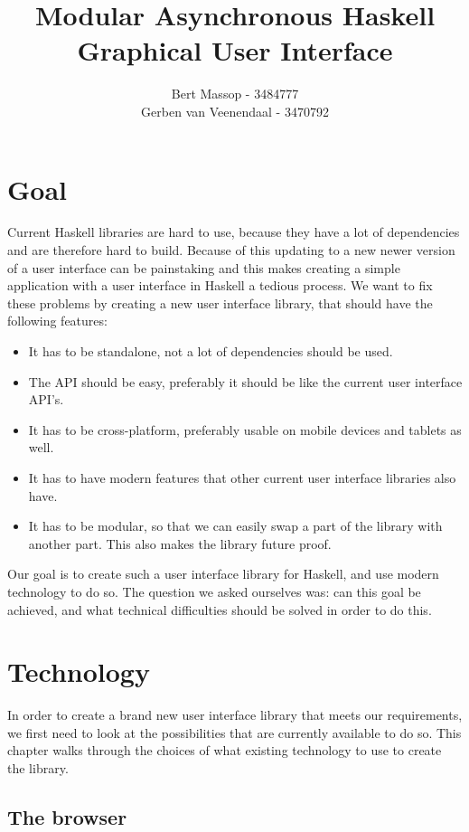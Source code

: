 \documentclass[11pt]{article}
\title{Modular Asynchronous Haskell Graphical User Interface}
\author{Bert Massop - 3484777\\
Gerben van Veenendaal - 3470792}
\begin{document}
\maketitle

\newpage
\tableofcontents

\newpage
\section{Goal}

Current Haskell libraries are hard to use, because they have a lot of dependencies and are therefore hard to build.
Because of this updating to a new newer version of a user interface can be painstaking and this makes creating a simple application with a user interface in Haskell a tedious process.
We want to fix these problems by creating a new user interface library, that should have the following features:

\begin{itemize}
\item It has to be standalone, not a lot of dependencies should be used.
\item The API should be easy, preferably it should be like the current user interface API's.
\item It has to be cross-platform, preferably usable on mobile devices and tablets as well.
\item It has to have modern features that other current user interface libraries also have.
\item It has to be modular, so that we can easily swap a part of the library with another part.
This also makes the library future proof.
\end{itemize}

Our goal is to create such a user interface library for Haskell, and use modern technology to do so.
The question we asked ourselves was: can this goal be achieved, and what technical difficulties should be solved in order to do this.

\section{Technology}

In order to create a brand new user interface library that meets our requirements, we first need to look at the possibilities that are currently available to do so.
This chapter walks through the choices of what existing technology to use to create the library.

\subsection{The browser}
\end{document}

